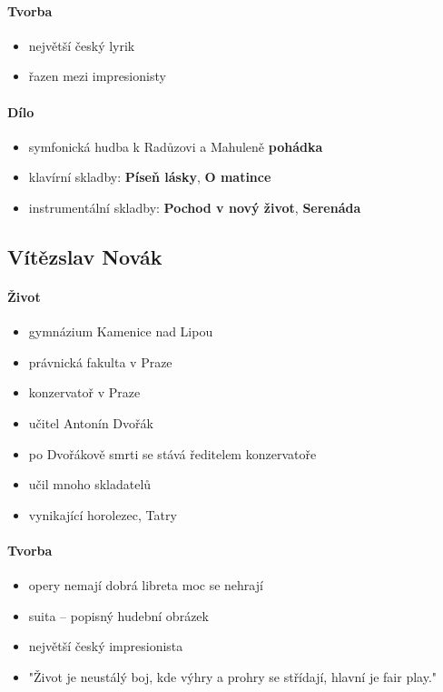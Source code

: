 \paragraph{Tvorba}
\begin{itemize}
\item největší český lyrik
\item řazen mezi impresionisty
\end{itemize}

\paragraph{Dílo}
\begin{itemize}
\item symfonická hudba k Radůzovi a Mahuleně \textbf{pohádka}
\item klavírní skladby: \textbf{Píseň lásky}, \textbf{O matince} 
\item instrumentální skladby: \textbf{Pochod v nový život}, \textbf{Serenáda}
\end{itemize}

\subsection{Vítězslav Novák}
\paragraph{Život}
\begin{itemize}
\item gymnázium Kamenice nad Lipou
\item právnická fakulta v Praze
\item konzervatoř v Praze
\item učitel Antonín Dvořák
\item po Dvořákově smrti se stává ředitelem konzervatoře
\item učil mnoho skladatelů 	
\item vynikající horolezec, Tatry
\end{itemize}

\paragraph{Tvorba}
\begin{itemize}
\item opery nemají dobrá libreta \ra moc se nehrají
\item suita -- popisný hudební obrázek
\item největší český impresionista
\item "Život je neustálý boj, kde výhry a prohry se střídají, hlavní je fair play."
\end{itemize}

